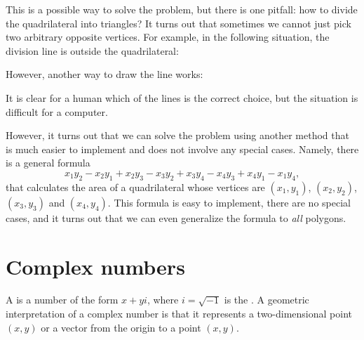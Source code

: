 This is a possible way to solve the problem,
but there is one pitfall:
how to divide the quadrilateral into triangles?
It turns out that sometimes we cannot just pick
two arbitrary opposite vertices.
For example, in the following situation,
the division line is outside the quadrilateral:
\begin{center}
\end{center}
However, another way to draw the line works:
\begin{center}
\end{center}
It is clear for a human which of the lines is the correct
choice, but the situation is difficult for a computer.
                           
However, it turns out that we can solve the problem using
another method that is much easier to implement
and does not involve any special cases.
Namely, there is a general formula
\[x_1y_2-x_2y_1+x_2y_3-x_3y_2+x_3y_4-x_4y_3+x_4y_1-x_1y_4,\]
that calculates the area of a quadrilateral
whose vertices are
$(x_1,y_1)$,
$(x_2,y_2)$,
$(x_3,y_3)$ and
$(x_4,y_4)$.
This formula is easy to implement, there are no special
cases, and it turns out that we can even generalize the formula
to \emph{all} polygons.

\section{Complex numbers}


A  is a number of the form $x+y i$,
where $i = \sqrt{-1}$ is the .
A geometric interpretation of a complex number is
that it represents a two-dimensional point $(x,y)$
or a vector from the origin to a point $(x,y)$.

